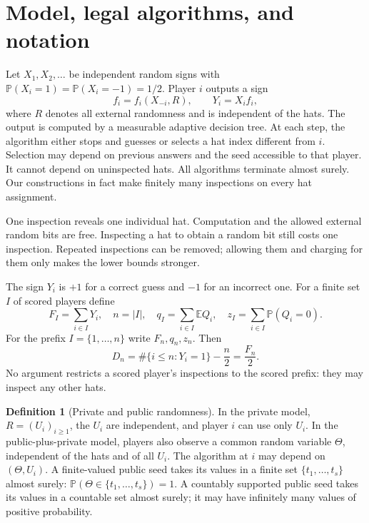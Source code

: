 \documentclass[11pt,letterpaper]{article}
\theoremstyle{definition}
\newtheorem{definition}[theorem]{Definition}
\newcommand{\E}{\mathbb E}
\newcommand{\Prb}{\mathbb P}
\begin{document}
\section{Model, legal algorithms, and notation}
\label{mbg:rnd:sec:model}

Let $X_1,X_2,\ldots$ be independent random signs with
$\Prb(X_i=1)=\Prb(X_i=-1)=1/2$. Player $i$ outputs a sign
\begin{equation}
 f_i=f_i(X_{-i},R),\qquad Y_i=X_i f_i,
 \label{mbg:rnd:eq:prediction}
\end{equation}
where $R$ denotes all external randomness and is independent of the
hats. The output is computed by a measurable adaptive decision tree.
At each step, the algorithm either stops and guesses or selects a hat
index different from $i$. Selection may depend on previous answers and
the seed accessible to that player. It cannot depend on uninspected
hats. All algorithms terminate almost surely. Our constructions in fact
make finitely many inspections on every hat assignment.

One inspection reveals one individual hat. Computation and the allowed
external random bits are free. Inspecting a hat to obtain a random bit
still costs one inspection. Repeated inspections can be removed; allowing
them and charging for them only makes the lower bounds stronger.

The sign $Y_i$ is $+1$ for a correct guess and $-1$ for an incorrect one.
For a finite set $I$ of scored players define
\begin{equation}
 F_I=\sum_{i\in I}Y_i,\quad n=|I|,\quad
 q_I=\sum_{i\in I}\E Q_i,\quad
 z_I=\sum_{i\in I}\Prb(Q_i=0).
 \label{mbg:rnd:eq:finite-notation}
\end{equation}
For the prefix $I=\{1,\ldots,n\}$ write $F_n,q_n,z_n$. Then
\begin{equation}
 D_n=\#\{i\le n:Y_i=1\}-\frac n2=\frac{F_n}{2}.
 \label{mbg:rnd:eq:surplus}
\end{equation}
No argument restricts a scored player's inspections to the scored
prefix: they may inspect any other hats.

\begin{definition}[Private and public randomness]
\label{mbg:rnd:def:randomness}
In the private model, $R=(U_i)_{i\ge1}$, the $U_i$ are independent, and
player $i$ can use only $U_i$. In the public-plus-private model, players
also observe a common random variable $\Theta$, independent of the hats and
of all $U_i$. The algorithm at $i$ may depend on $(\Theta,U_i)$. A
finite-valued public seed takes its values in a finite set
$\{t_1,\ldots,t_s\}$ almost surely: $\Prb(\Theta\in\{t_1,\ldots,t_s\})=1$.
A countably supported public seed takes its values in a countable set
almost surely; it may have infinitely many values of positive probability.
\end{definition}
\end{document}
